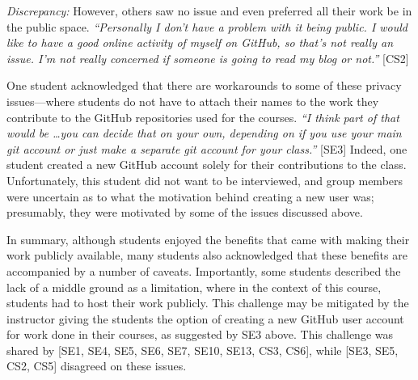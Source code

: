 
\emph{Discrepancy:} However, others saw no issue and even preferred all their work be in the public space. \textit{``Personally I don't have a problem with it being public. I would like to have a good online activity of myself on GitHub, so that's not really an issue. I'm not really concerned if someone is going to read my blog or not.''} [CS2]

One student acknowledged that there are workarounds to some of these privacy issues---where students do not have to attach their names to the work they contribute to the GitHub repositories used for the courses. \textit{``I think part of that would be \ldots you can decide that on your own, depending on if you use your main git account or just make a separate git account for your class.''} [SE3] Indeed, one student created a new GitHub account solely for their contributions to the class. Unfortunately, this student did not want to be interviewed, and group members were uncertain as to what the motivation behind creating a new user was; presumably, they were motivated by some of the issues discussed above.

In summary, although students enjoyed the benefits that came with making their work publicly available, many students also acknowledged that these benefits are accompanied by a number of caveats. Importantly, some students described the lack of a middle ground as a limitation, where in the context of this course, students had to host their work publicly. This challenge may be mitigated by the instructor giving the students the option of creating a new GitHub user account for work done in their courses, as suggested by SE3 above. This challenge was shared by [SE1, SE4, SE5, SE6, SE7, SE10, SE13, CS3, CS6], while [SE3, SE5, CS2, CS5] disagreed on these issues. \\


